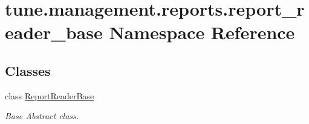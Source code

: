 \hypertarget{namespacetune_1_1management_1_1reports_1_1report__reader__base}{\section{tune.\-management.\-reports.\-report\-\_\-reader\-\_\-base Namespace Reference}
\label{namespacetune_1_1management_1_1reports_1_1report__reader__base}
}
\subsection*{Classes}
\begin{DoxyCompactItemize}
\item 
class \hyperlink{classtune_1_1management_1_1reports_1_1report__reader__base_1_1ReportReaderBase}{Report\-Reader\-Base}
\begin{DoxyCompactList}\small\item\em Base Abstract class. \end{DoxyCompactList}\end{DoxyCompactItemize}
